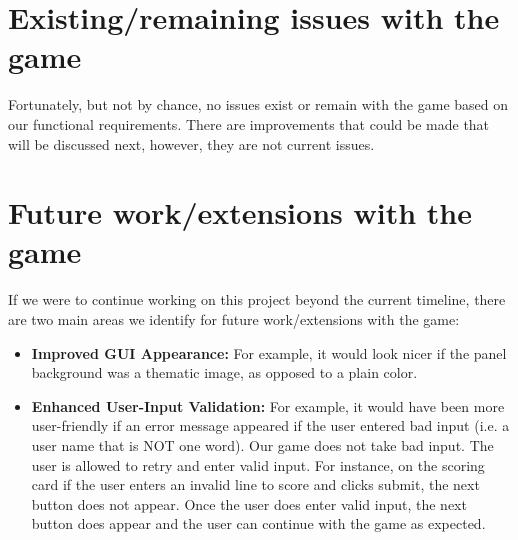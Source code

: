 \documentclass[]{report}   %
\begin{document}
\section{Existing/remaining issues with the game}     %
Fortunately, but not by chance, no issues exist or remain with the game based on our functional requirements. There are improvements that could be made that will be discussed next, however, they are not current issues.
\section{Future work/extensions with the game}     %
If we were to continue working on this project beyond the current timeline, there are two main areas we identify for future work/extensions with the game:
\begin{itemize}
\item \textbf{Improved GUI Appearance:} For example, it would look nicer if the panel background was a thematic image, as opposed to a plain color.
\item \textbf{Enhanced User-Input Validation:} For example, it would have been more user-friendly if an error message appeared if the user entered bad input (i.e. a user name that is NOT one word). Our game does not take bad input. The user is allowed to retry and enter valid input. For instance, on the scoring card if the user enters an invalid line to score and clicks submit, the next button does not appear. Once the user does enter valid input, the next button does appear and the user can continue with the game as expected. 
\end{itemize}
\end{document}
